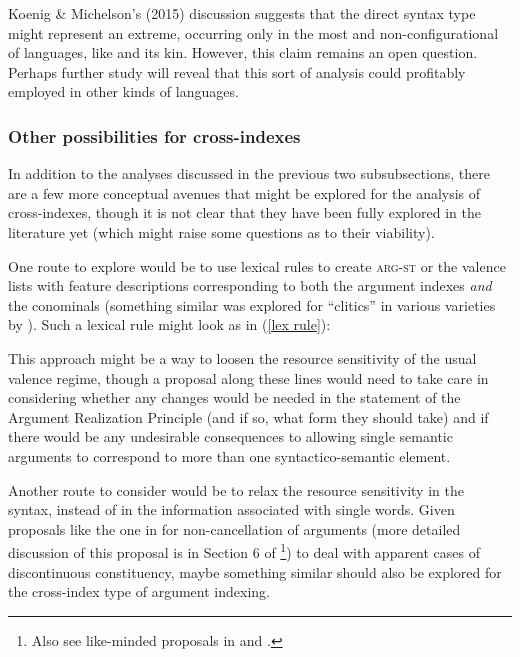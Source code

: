 \documentclass[output=paper
	        ,collection
	        ,collectionchapter
 	        ,biblatex
                ,babelshorthands
                ,newtxmath
                ,draftmode
                ,colorlinks, citecolor=brown
]{langscibook}
\begin{document}
Koenig \& Michelson's (2015) discussion suggests that the direct syntax type might represent an extreme, occurring only in the most  and non-configurational  of languages, like  and its  kin. However, this claim remains an open question. Perhaps further study will reveal that this sort of analysis could profitably employed in other kinds of languages.  

\subsubsection{Other possibilities for cross-indexes} \label{other poss for cross}

In addition to the analyses discussed in the previous two subsubsections, there are a few more conceptual avenues that might be explored for the analysis of cross-indexes, though it is not clear that they have been fully explored in the literature yet (which might raise some questions as to their viability). 

One route to explore would be to use lexical rules to create \textsc{arg-st} or the valence lists with feature descriptions corresponding to both the argument indexes \emph{and} the conominals (something similar was explored for ``clitics'' in various  varieties by \citealt{monachesi05}). Such a lexical rule might look as in (\ref{lex rule}):
%
\begin{exe}
\ex \label{lex rule}
\end{exe}
%
This approach might be a way to loosen the resource sensitivity of the usual valence regime, though a proposal along these lines would need to take care in considering whether any changes would be needed in the statement of the Argument Realization Principle (and if so, what form they should take) and if there would be any undesirable consequences to allowing single semantic arguments to correspond to more than one syntactico-semantic element.    

Another route to consider would be to relax the resource sensitivity in the syntax, instead of in the information associated with single words. Given proposals like the one in \citet{Bender2008a} for non-cancellation of arguments (more detailed discussion of this proposal is in Section 6 of \footnote{Also see like-minded proposals in \citet{Meurers99b} and \citet{Mueller2008a}.}) to deal with apparent cases of discontinuous constituency, maybe something similar should also be explored for the cross-index type of argument indexing. 
\end{document}
